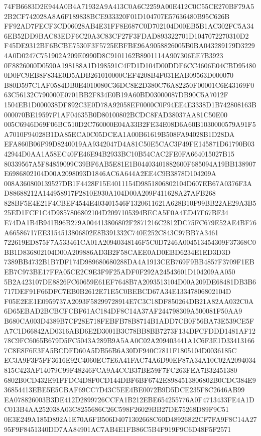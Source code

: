 \documentclass[UTF8,fontset=fandol,zihao=-4,a4paper]{ctexart}
\begin{document}
{{74FB6683D2E944A0B4A71932A9A413C0A6C2259A00E412C0C55CE270BF79A52B2CF742028A8A6F189838BCE933320F01D104707E57636480B95C626B
FF92AD7FECF3CD06028AB4E31FF8E687C0D702104D00EB5B1AC302FC5A346EB52DD9BAC83EDF6C20A3C83CF27F3FDAD893322701D1047072270310D2
F45DE9312BF6BCBE7530F3F5725EBFBE96A9058826005B0BA043289179D32294A0D0247C751902A209E0990D8C9101162B8901114A907306EE7B3923
0F8826000D0590A198188A1D198591C4FD1D104D00DDF6CC4606E04CBD954800D0FC9EB8F834E0D5ADB261010000CEF4208B4F031EAB09563D000070
B80D597C1AF0584DB0E4010080C36DC8E2D380C76A82250F00001C6E43169F063C56132C790000E0701BB2F834E0B19A60BD03000087DB90C5A7012F
1504EB1D000038DF892C3E0D78A92058EF0000C0F94EE4E3338D1B742808163B000070BE19597F1AF04635B0D80100802BCDC8FAD38037AA81C50E00
005C6946D69F06BC510D2C760000E04A33B2FE34E08D6A60B1030000579A91F5A7010F94028B1DA85ECA0C05DCEA1A00B61619B508FA94028B1D28DA
EFA860B06F99D8240019AA9342047D4A81C50E5CAC3F49FE145871D61790B0342944D0AA1A58EC40FE46E94B2933BC10B54CAC2FE0FA664015027B15
80339567A5F84859099C39BF6AB5E81E1B04403401882600F685094A19BB138907E6986802104D00A2098093D1846AC6A644A2EE4C9B3878D104209A
008A360800139527DB1F4428F15E4011154D9851806802104D607EB67A0376F3AD88688212A144958917F2810E930A104D00A209F411628A27AFB268
828BF5E4E21F4CBEF4544E403401546F1320611621A628B10F99BB22AE29A3B525ED1FCF1C4D9857806802104D2097105394BECA5F0A4ED47F67BF34
E74DA1B4B941B96B279A004413806802F2871216C2812DC75FC679E52AE4BF76A66586717EE3154513806802E8B391332C740E252C843C97BB7A3461
722619ED875F7A533461CA01A20940348146F5C0D7246A004513454309F37368C0BB1D836802104D00A209886AD3B2F58CAEE0AD0EBD6234E1ED3D3D
7389BB4732B1B7DF174D989680680288DA4A1913CEB769F9BB4857F3709F1EBEB7C973BE17FFA05CE2C9E3F9F25ADF0F292A24543601D104209AA050
5B2A423107DE8826FC60659E61EF7648B7A2093513104D00A209DE68481DB3B6717DEF91F66DFC7EB0B2612E71E5C0BEBCD67A34E13347806802104D
F05E2EE1E0959737A2093F58299728914E7C3C18DF850264DB21A82AA032C0A6D65EBAD2BCBCFCBF61AC184DF8C14A37AF244798309A500081F50AA9
B680CA003D4389B7CF28E718FEBFB78B8714B1ADD7CB0F56BA73E539CE5FA7C1D66842AD0316ABD6E2D3001B3C78BB8BB7273F134DFCFDDD1481AF12
78C9FC6065B679D5FC5043A289B9A5AA0C02A209403441A1C6F3E1D334131667C8E8F6E3FA5BCDFD60A5DB56B6A30DF940C7811F1805104D0036185C
EC3A9F3F5FF3616E92C4060EC7E6A41FAC74A6D90EF87A34A10C02A2094034815C423AF14079C99F48246FCA9A4CCB37BE59F7FC263FEA7B32451380
6802B0CD432E91FFDC4D8F0CD144DBF6BF6742E8984513806802B0CDC384E936854413EBE5E5CBAF69CC7D43C5EE4BE0072B9D5DCE235F8C2646AB99
EA078826003B3DE412D2899726CCFA1B212EBE654255776A0F4713433FE4A1DC013B4AA252038A03C8255686C26C598F26029BB27DE75268D89F9C51
0E3E249A185D892A1E70A6FB506D4071302668C60D48926822CF7FA9F8C14A2795F9F8451340DD7AA84901AC7AB4E1FB86C5B4F919F9C6D48F5F2571
}}
\end{document}
